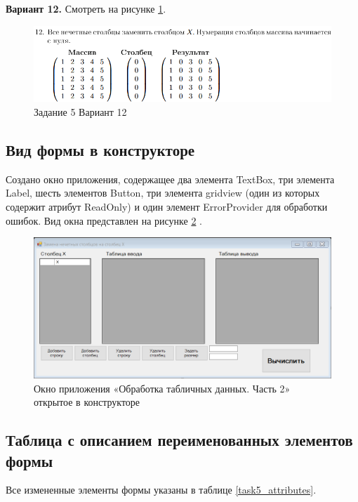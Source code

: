 \textbf{Вариант 12.} Смотреть на рисунке \ref{task5_var12}.
\begin{figure}[H]
    \centering
    \includegraphics[width=0.9\linewidth]{lections/img/task5_var12.png}
    \caption{Задание 5 Вариант 12}
    \label{task5_var12}
\end{figure}

\subsection{Вид формы в конструкторе}


Создано окно приложения, содержащее два элемента TextBox, три элемента Label, шесть элементов Button, три элемента gridview (один из которых содержит атрибут ReadOnly) и один элемент ErrorProvider для обработки ошибок. Вид окна представлен на рисунке \ref{task5_form} \cite{лафоре2011объектно}.
\begin{figure}[H]
    \centering
    \includegraphics[width=1\linewidth]{lections/img/task5_form.png}
    \caption{Окно приложения «Обработка табличных данных. Часть 2» открытое в конструкторе}
    \label{task5_form}
\end{figure}


\subsection{Таблица с описанием переименованных элементов формы}
Все измененные элементы формы указаны в таблице \ref{task5_attributes}.

